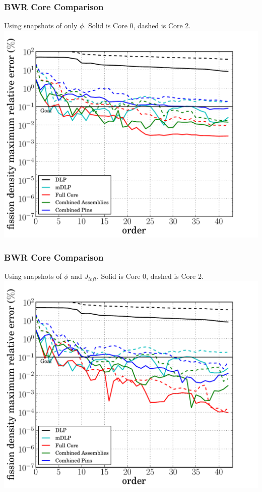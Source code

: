 \documentclass[fleqn]{beamer}
\begin{document}
  \begin{frame}
    \frametitle{BWR Core Comparison}
    \begin{center}
    Using snapshots of only $\phi$. Solid is Core 0, dashed is Core 2.
    \includegraphics[trim=.1cm .25cm 2.0cm .4cm, clip=true, totalheight=.8\textheight]{BWR_energy_basis_comparison_fission-44}
    \end{center}
  \end{frame}

  \begin{frame}
    \frametitle{BWR Core Comparison}
    \begin{center}
    Using snapshots of $\phi$ and $J_{left}$. Solid is Core 0, dashed is Core 2.
    \includegraphics[trim=.1cm .25cm 2.0cm .4cm, clip=true, totalheight=.8\textheight]{BWRpartial_energy_basis_comparison_fission-44}
    \end{center}
  \end{frame}
\end{document}
